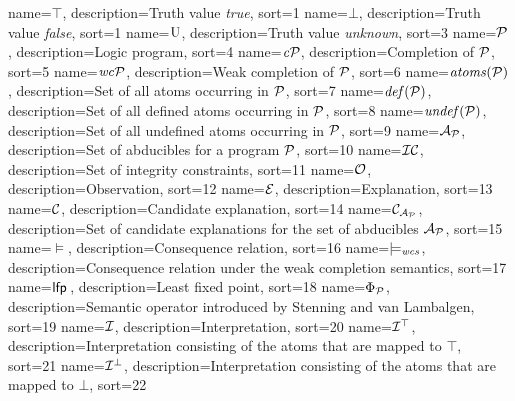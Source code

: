 {
  name=$\top$,
  description={Truth value \textit{true}},
  sort={1}
}
{
  name=$\bot$,
  description={Truth value \textit{false}},
  sort={1}
}
{
  name=$\mbox{\normalfont U}$,
  description={Truth value \textit{unknown}},
  sort={3}
}
{
  name=$\mathcal{P}$,
  description={Logic program},
  sort={4}
}
{
  name=$\mathit{c}\mathcal{P}$,
  description={Completion of $\mathcal{P}$},
  sort={5}
}
{
  name=$\mathit{wc}\mathcal{P}$,
  description={Weak completion of $\mathcal{P}$},
  sort={6}
}
{
  name=$\mathit{atoms}(\mathcal{P})$,
  description={Set of all atoms occurring in $\mathcal{P}$},
  sort={7}
}
{
  name=$\mathit{def}(\mathcal{P})$,
  description={Set of all defined atoms occurring in $\mathcal{P}$},
  sort={8}
}
{
  name=$\mathit{undef}(\mathcal{P})$,
  description={Set of all undefined atoms occurring in $\mathcal{P}$},
  sort={9}
}
{
  name=$\mathcal{A}_{\mathcal{P}}$,
  description={Set of abducibles for a program $\mathcal{P}$},
  sort={10}
}
{
  name=${\cal IC}$,
  description={Set of integrity constraints},
  sort={11}
}
{
  name=$\mathcal{O}$,
  description={Observation},
  sort={12}
}
{
  name=$\mathcal{E}$,
  description={Explanation},
  sort={13}
}
{
  name=$\mathcal{C}$,
  description={Candidate explanation},
  sort={14}
}
{
  name=$\mathcal{C}_{\mathcal{A}_{\mathcal{P}}}$,
  description={Set of candidate explanations for the set of abducibles $\mathcal{A}_{\mathcal{P}}$},
  sort={15}
}
{
  name=$\models$,
  description={Consequence relation},
  sort={16}
}
{
  name=$\models_{\normalfont\textit{wcs}}$,
  description={Consequence relation under the weak completion semantics},
  sort={17}
}
{
  name=$\mathsf{lfp}\,$,
  description={Least fixed point},
  sort={18}
}
{
  name=$\Phi_{\mathcal{P}}$,
  description={Semantic operator introduced by Stenning and van Lambalgen},
  sort={19}
}
{
  name=$\mathcal{I}$,
  description={Interpretation},
  sort={20}
}
{
  name=$\mathcal{I}^\top$,
  description={Interpretation consisting of the atoms that are mapped to $\top$},
  sort={21}
}
{
  name=$\mathcal{I}^\bot$,
  description={Interpretation consisting of the atoms that are mapped to $\bot$},
  sort={22}
}